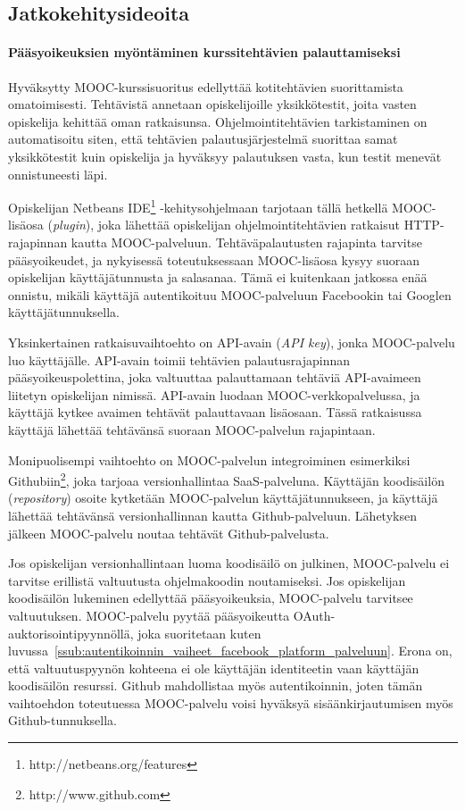 \documentclass[finnish,gradu]{tktltiki}
\begin{document}
  \subsection{Jatkokehitysideoita} %
  \label{sub:jatkokehitysideoita}

  \paragraph{Pääsyoikeuksien myöntäminen kurssitehtävien palauttamiseksi} \hfill %
  \label{par:pääsyoikeuksien_myöntäminen_ohjelmakoodin_palauttamiseksi}

    Hyväksytty MOOC-kurssisuoritus edellyttää kotitehtävien suorittamista omatoimisesti. Tehtävistä annetaan opiskelijoille yksikkötestit, joita vasten opiskelija kehittää oman ratkaisunsa. Ohjelmointitehtävien tarkistaminen on automatisoitu siten, että tehtävien palautusjärjestelmä suorittaa samat yksikkötestit kuin opiskelija ja hyväksyy palautuksen vasta, kun testit menevät onnistuneesti läpi.

    Opiskelijan Netbeans IDE\footnote{http://netbeans.org/features} -kehitysohjelmaan tarjotaan tällä hetkellä MOOC-lisäosa (\emph{plugin}), joka lähettää opiskelijan ohjelmointitehtävien ratkaisut HTTP-rajapinnan kautta MOOC-palveluun. Tehtäväpalautusten rajapinta tarvitse pääsyoikeudet, ja nykyisessä toteutuksessaan MOOC-lisäosa kysyy suoraan opiskelijan käyttäjätunnusta ja salasanaa. Tämä ei kuitenkaan jatkossa enää onnistu, mikäli käyttäjä autentikoituu MOOC-palveluun Facebookin tai Googlen käyttäjätunnuksella.

    Yksinkertainen ratkaisuvaihtoehto on API-avain (\emph{API key}), jonka MOOC-palvelu luo käyttäjälle. API-avain toimii tehtävien palautusrajapinnan pääsyoikeuspolettina, joka valtuuttaa palauttamaan tehtäviä API-avaimeen liitetyn opiskelijan nimissä. API-avain luodaan MOOC-verkkopalvelussa, ja käyttäjä kytkee avaimen tehtävät palauttavaan lisäosaan. Tässä ratkaisussa käyttäjä lähettää tehtävänsä suoraan MOOC-palvelun rajapintaan.

    Monipuolisempi vaihtoehto on MOOC-palvelun integroiminen esimerkiksi Githubiin\footnote{http://www.github.com}, joka tarjoaa versionhallintaa SaaS-palveluna. Käyttäjän koodisäilön (\emph{repository}) osoite kytketään MOOC-palvelun käyttäjätunnukseen, ja käyttäjä lähettää tehtävänsä versionhallinnan kautta Github-palveluun. Lähetyksen jälkeen MOOC-palvelu noutaa tehtävät Github-palvelusta.

    Jos opiskelijan versionhallintaan luoma koodisäilö on julkinen, MOOC-palvelu ei tarvitse erillistä valtuutusta ohjelmakoodin noutamiseksi. Jos opiskelijan koodisäilön lukeminen edellyttää pääsyoikeuksia, MOOC-palvelu tarvitsee valtuutuksen. MOOC-palvelu pyytää pääsyoikeutta OAuth-auktorisointipyynnöllä, joka suoritetaan kuten luvussa~\ref{ssub:autentikoinnin_vaiheet_facebook_platform_palveluun}. Erona on, että valtuutuspyynön kohteena ei ole käyttäjän identiteetin vaan käyttäjän koodisäilön resurssi. Github mahdollistaa myös autentikoinnin, joten tämän vaihtoehdon toteutuessa MOOC-palvelu voisi hyväksyä sisäänkirjautumisen myös Github-tunnuksella.
\end{document}
